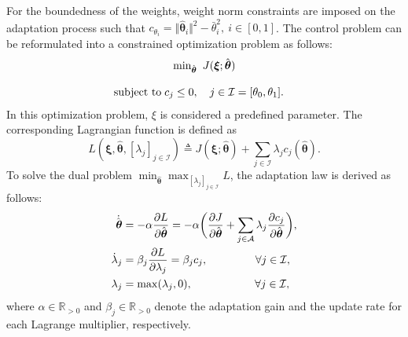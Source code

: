 \documentclass[letterpaper, 10 pt, conference]{ieeeconf}  %
\newcommand\R{\mathbb{R}}
\newcommand*{\mv}[1]{\boldsymbol{#1}}
\begin{document}
For the boundedness of the weights, weight norm constraints are imposed on the adaptation process such that $c_{\theta_i}=\Vert{\hat{\mv\theta}}_i\Vert^2-\bar\theta^2_i,\ i\in[0,1]$.
The control problem can be reformulated into a constrained optimization problem as follows:
\begin{equation}
    \begin{matrix}
        \min_{{\hat{\mv\theta}}} \ J(\mv \xi;{\hat{\mv\theta}})
        \\ \\
        \begin{aligned}
        \text{subject to\;}&c_{j}\le0, \quad j\in\mathcal I = [\theta_0,\theta_1].
        \end{aligned}
    \end{matrix}
\end{equation}
In this optimization problem, $\xi$ is considered a predefined parameter.
The corresponding Lagrangian function is defined as
\begin{equation}
    L(
        \mv \xi,
        {\hat{\mv\theta}},
        [\lambda_j]_{j\in\mathcal I}
    )
    \triangleq 
    J(\mv \xi;{\hat{\mv\theta}})
    +
    \sum_{j\in\mathcal I} \lambda_jc_j({\hat{\mv\theta}})
    .
\end{equation}
To solve the dual problem $\min_{{\hat{\mv\theta}}} \max_{[\lambda_j]_{j\in\mathcal I}}  L$, the adaptation law is derived as follows:
\begin{align}
        \dot {{\hat{\mv\theta}}}&=-\alpha {\partial L\over\partial {\hat{\mv\theta}}}
        =-\alpha 
        \bigg(
        {\partial J\over \partial {\hat{\mv\theta}}}+\sum_{j\in\mathcal{A}}
        \lambda_j {\partial c_j\over \partial {\hat{\mv\theta}}}
        \bigg),
    \label{eq. adaptation law th}
        \\
        \dot\lambda_j& = \beta_j{\partial L\over\partial \lambda_j} = \beta_j c_j ,
        \quad\quad\quad\quad      \      
        \forall j\in\mathcal I,
    \label{eq. adaptation law L}
        \\
        \lambda_j & = \max(\lambda_j,0) ,
        \quad\quad\quad\quad\ \ \ \ \ 
        \forall j\in\mathcal I,
    \label{eq. adaptation law L max}
\end{align}
where $\alpha\in\R_{>0}$ and $\beta_j\in\R_{>0}$ denote the adaptation gain and the update rate for each Lagrange multiplier, respectively.
\color{red}
\color{black}
\end{document}
